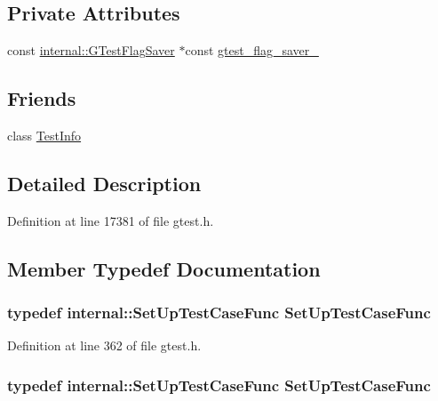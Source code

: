 \subsection*{\-Private \-Attributes}
\begin{DoxyCompactItemize}
\item 
const \hyperlink{classtesting_1_1internal_1_1GTestFlagSaver}{internal\-::\-G\-Test\-Flag\-Saver} \*
$\ast$const \hyperlink{classtesting_1_1Test_a5c5cbe8574985dae0b70d4b09b142673}{gtest\-\_\-flag\-\_\-saver\-\_\-}
\end{DoxyCompactItemize}
\subsection*{\-Friends}
\begin{DoxyCompactItemize}
\item 
class \hyperlink{classtesting_1_1Test_aed3c96e2bd5a46339c1cbe49a4a233ee}{\-Test\-Info}
\end{DoxyCompactItemize}


\subsection{\-Detailed \-Description}


\-Definition at line 17381 of file gtest.\-h.



\subsection{\-Member \-Typedef \-Documentation}
\hypertarget{classtesting_1_1Test_a2df065892efeff7ca91bb2d2fbe00975}{
\subsubsection[{\-Set\-Up\-Test\-Case\-Func}]{\setlength{\rightskip}{0pt plus 5cm}typedef {\bf internal\-::\-Set\-Up\-Test\-Case\-Func} {\bf \-Set\-Up\-Test\-Case\-Func}}}\label{db/d9f/classtesting_1_1Test_a2df065892efeff7ca91bb2d2fbe00975}


\-Definition at line 362 of file gtest.\-h.

\hypertarget{classtesting_1_1Test_a2df065892efeff7ca91bb2d2fbe00975}{
\subsubsection[{\-Set\-Up\-Test\-Case\-Func}]{\setlength{\rightskip}{0pt plus 5cm}typedef {\bf internal\-::\-Set\-Up\-Test\-Case\-Func} {\bf \-Set\-Up\-Test\-Case\-Func}}}\label{db/d9f/classtesting_1_1Test_a2df065892efeff7ca91bb2d2fbe00975}


